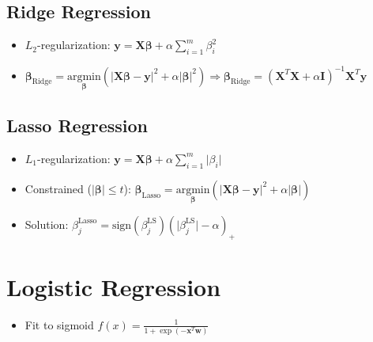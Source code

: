 \documentclass[11pt]{article}
\begin{document}
\hypertarget{ridge-regression}{%
\subsection*{Ridge Regression}\label{ridge-regression}}

\begin{itemize}
    \item $L_2$-regularization: $\boldsymbol{y} = \boldsymbol{X}\boldsymbol{\beta} + \alpha\sum\limits_{i=1}^m\beta^2_i$
    \item $\boldsymbol{\beta}_{\text{Ridge}} = \underset{\boldsymbol{\beta}}{\text{arg}\text{min}}\left({\big|}\boldsymbol{X}\boldsymbol{\beta} - \boldsymbol{y}{\big|}^2 + \alpha{\big|}\boldsymbol{\beta}{\big|}^2\right) \Rightarrow \boldsymbol{\beta}_{\text{Ridge}} = \left(\boldsymbol{X}^T\boldsymbol{X} + \alpha \boldsymbol{I}\right)^{-1}\boldsymbol{X}^T\boldsymbol{y}$
\end{itemize}

\hypertarget{lasso-regression}{%
\subsection*{Lasso Regression}\label{lasso-regression}}

\begin{itemize}
    \item $L_1$-regularization: $\boldsymbol{y} = \boldsymbol{X}\boldsymbol{\beta} + \alpha\sum\limits_{i=1}^m{\big|}\beta_i{\big|}$
    \item Constrained ($|\boldsymbol{\beta}|\leq t$): $\boldsymbol{\beta}_{\text{Lasso}} = \underset{\boldsymbol{\beta}}{\text{arg}\text{min}}\left({\big|}\boldsymbol{X}\boldsymbol{\beta} - \boldsymbol{y}{\big|}^2 + \alpha{\big|}\boldsymbol{\beta}{\big|}\right)$
    \item Solution: $\beta^{\text{Lasso}}_j = \text{sign}\left(\beta^{\text{LS}}_j\right)\left({\big|}\beta^{\text{LS}}_j{\big|} - \alpha\right)_+$
\end{itemize}


\newpage
\hypertarget{logistic-regression}{%
\section*{Logistic Regression}\label{logistic-regression2}}

\begin{itemize}
    \item Fit to sigmoid $f(x) = \frac{1}{1 + \exp(-\boldsymbol{x}^T\boldsymbol{w})}$
\end{itemize}
\begin{center}
\end{center}
{ \hspace*{\fill} \\}
\end{document}
